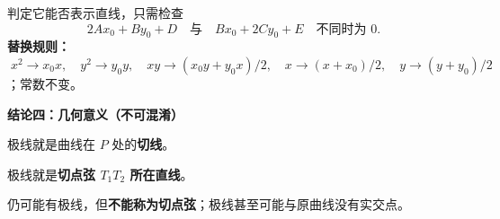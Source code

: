 \begin{statementbox}
\begin{minipage}{\linewidth}
\par\smallskip
判定它能否表示直线，只需检查
\[
 \boxed{2Ax_0+By_0+D\quad\text{与}\quad Bx_0+2Cy_0+E\quad\text{不同时为 }0.}
\]
\textbf{替换规则：}
$\;x^2\to x_0x,\quad y^2\to y_0y,\quad
xy\to (x_0y+y_0x)/2,\quad
x\to(x+x_0)/2,\quad y\to(y+y_0)/2$；常数不变。
\end{minipage}
\par\medskip
\textbf{\textcolor{CStatement}{结论四：几何意义（不可混淆）}}
\begin{description}[style=nextline,leftmargin=2.8em,labelsep=0.5em,itemsep=0.3em]
 \item[\textbf{点 $P$ 在曲线上：}] 极线就是曲线在 $P$ 处的\textbf{切线}。
 \item[\textbf{从 $P$ 有两个不同的实切点 $T_1,T_2$：}] 极线就是\textbf{切点弦 $T_1T_2$ 所在直线}。
 \item[\textbf{没有两个不同的实切点：}] 仍可能有极线，但\textbf{不能称为切点弦}；极线甚至可能与原曲线没有实交点。
\end{description}
\end{statementbox}
